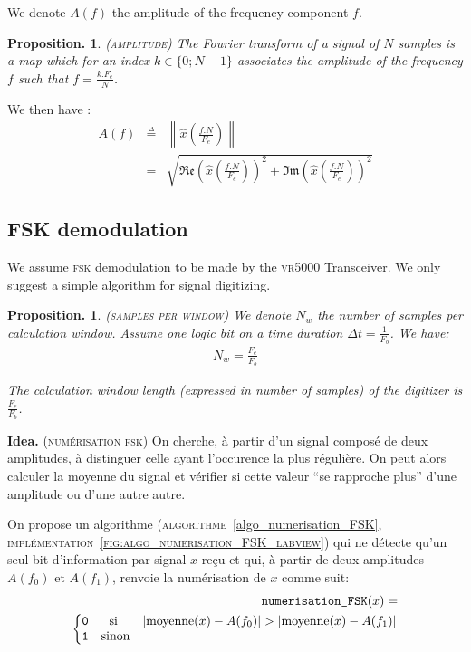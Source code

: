 \documentclass[twocolumn,pre,floats,aps,amsmath,amssymb]{revtex4}
\newtheorem{proposition}[theorem]{Proposition.}
\begin{document}
We denote $A (f)$ the amplitude of the frequency component $f$.

\begin{proposition}
\textsc{(amplitude)}
The Fourier transform of a signal of $N$ samples is a map which for an index $k \in \{0 ; N - 1\}$ associates the amplitude of the frequency $f$ such that $f = \frac{k.F_e}{N}$.
\end{proposition}

We then have\cite{Senlis} :
\begin{eqnarray*}
  A (f) &\overset{\underset{\Delta}{}}{=}& \left \| \hat{x} \left (\frac{f.N}{F_e} \right ) \right \|\\
        &=& \sqrt{\mathfrak{Re} \left ( \hat{x} \left (\frac{f.N}{F_e} \right ) \right )^2 + \mathfrak{Im} \left ( \hat{x} \left (\frac{f.N}{F_e} \right ) \right )^2}
\end{eqnarray*}

\subsection{FSK demodulation}

We assume \textsc{fsk} demodulation to be made by the \textsc{vr5000} Transceiver. We only suggest a simple algorithm for signal digitizing.

\begin{proposition}
  \textsc{(samples per window)}
  We denote $N_w$ the number of samples per calculation window. Assume one logic bit on a time duration $\Delta t = \frac{1}{F_b}$. We have:
  \begin{eqnarray}
    N_w = \frac{F_e}{F_b}
  \end{eqnarray}

  The calculation window length (expressed in number of samples) of the digitizer is $\frac{F_e}{F_b}$.
\end{proposition}

\noindent
\textbf{Idea.}
\textsc{(num\'erisation fsk)}
  On cherche, \`a partir d'un signal compos\'e de deux amplitudes, \`a distinguer celle ayant l'occurence la plus r\'eguli\`ere. On peut alors calculer la moyenne du signal et v\'erifier si cette valeur ``se rapproche plus'' d'une amplitude ou d'une autre autre.

On propose un algorithme (\textsc{algorithme}~\ref{algo_numerisation_FSK}, \textsc{impl\'ementation~\ref{fig:algo_numerisation_FSK_labview}}) qui ne d\'etecte qu'un seul bit d'information par signal $x$ re\c{c}u et qui, \`a partir de deux amplitudes $A(f_0)$ et $A(f_1)$, renvoie la num\'erisation de $x$ comme suit:
  \begin{eqnarray*}
    \texttt{numerisation\_FSK} (x) =\\
    \left\{\begin{matrix}
    \texttt{0} &\textup{si }& \left | \operatorname{moyenne}(x) - A(f_0) \right | > \left | \operatorname{moyenne}(x) - A(f_1) \right |\\ 
    \texttt{1} &\textup{sinon}&
    \end{matrix}\right.
  \end{eqnarray*}
\end{document}
